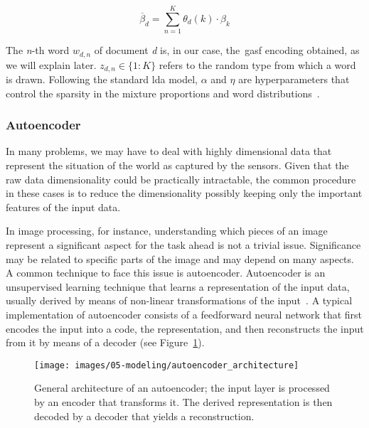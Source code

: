 \begin{equation}
\overline{\beta}_{d} = \sum_{n=1}^{K} \theta_{d}(k) \cdot \beta_{k}
\end{equation}

The \textit{n}-th word $w_{d,n}$ of document \textit{d} is, in our case, the~\gls{gasf} encoding obtained, as we will explain later. $z_{d,n} \in \{1:K\}$ refers to the random type from which a word is drawn. Following the standard \gls{lda} model, $\alpha$ and $\eta$ are hyperparameters that control the sparsity in the mixture proportions and word distributions~\cite{smith_mining_2016}.

\subsubsection{Autoencoder}\label{section:autoencoder}

In many problems, we may have to deal with highly dimensional data that represent the situation of the world as captured by the sensors. Given that the raw data dimensionality could be practically intractable, the common procedure in these cases is to reduce the dimensionality possibly keeping only the important features of the input data.

In image processing, for instance, understanding which pieces of an image represent a significant aspect for the task ahead is not a trivial issue. Significance may be related to specific parts of the image and may depend on many aspects. A common technique to face this issue is {autoencoder}.
Autoencoder is an unsupervised learning technique that learns a representation of the input data, usually derived by means of non-linear transformations of the input~\cite{goodfellow_deep_2016}.
A typical implementation of autoencoder consists of a feedforward neural network that first encodes the input into a code, the representation, and then reconstructs the input from it by means of a decoder (see Figure~\ref{fig:autoencoder_architecture}).

\begin{figure}[H]
\centering
\texttt{[image: images/05-modeling/autoencoder\_architecture]}
\caption[Autoencoder general architecture]{General architecture of an autoencoder; the input layer is processed by an encoder that transforms it. The derived representation is then decoded by a decoder that yields a reconstruction.}
\label{fig:autoencoder_architecture}
\end{figure}

